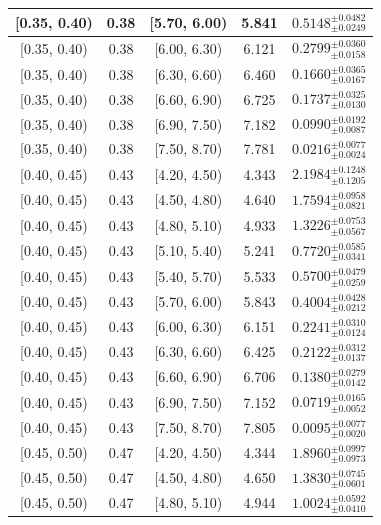 \begin{longtable}{|c|c|c|c|c|}
\hline
[0.35, 0.40) & 0.38 & [5.70, 6.00) & 5.841 & $0.5148^{ \pm 0.0482 }_{ \pm 0.0249 }$ \\ 
\hline
[0.35, 0.40) & 0.38 & [6.00, 6.30) & 6.121 & $0.2799^{ \pm 0.0360 }_{ \pm 0.0158 }$ \\ 
\hline
[0.35, 0.40) & 0.38 & [6.30, 6.60) & 6.460 & $0.1660^{ \pm 0.0365 }_{ \pm 0.0167 }$ \\ 
\hline
[0.35, 0.40) & 0.38 & [6.60, 6.90) & 6.725 & $0.1737^{ \pm 0.0325 }_{ \pm 0.0130 }$ \\ 
\hline
[0.35, 0.40) & 0.38 & [6.90, 7.50) & 7.182 & $0.0990^{ \pm 0.0192 }_{ \pm 0.0087 }$ \\ 
\hline
[0.35, 0.40) & 0.38 & [7.50, 8.70) & 7.781 & $0.0216^{ \pm 0.0077 }_{ \pm 0.0024 }$ \\ 
\hline
[0.40, 0.45) & 0.43 & [4.20, 4.50) & 4.343 & $2.1984^{ \pm 0.1248 }_{ \pm 0.1205 }$ \\ 
\hline
[0.40, 0.45) & 0.43 & [4.50, 4.80) & 4.640 & $1.7594^{ \pm 0.0958 }_{ \pm 0.0821 }$ \\ 
\hline
[0.40, 0.45) & 0.43 & [4.80, 5.10) & 4.933 & $1.3226^{ \pm 0.0753 }_{ \pm 0.0567 }$ \\ 
\hline
[0.40, 0.45) & 0.43 & [5.10, 5.40) & 5.241 & $0.7720^{ \pm 0.0585 }_{ \pm 0.0341 }$ \\ 
\hline
[0.40, 0.45) & 0.43 & [5.40, 5.70) & 5.533 & $0.5700^{ \pm 0.0479 }_{ \pm 0.0259 }$ \\ 
\hline
[0.40, 0.45) & 0.43 & [5.70, 6.00) & 5.843 & $0.4004^{ \pm 0.0428 }_{ \pm 0.0212 }$ \\ 
\hline
[0.40, 0.45) & 0.43 & [6.00, 6.30) & 6.151 & $0.2241^{ \pm 0.0310 }_{ \pm 0.0124 }$ \\ 
\hline
[0.40, 0.45) & 0.43 & [6.30, 6.60) & 6.425 & $0.2122^{ \pm 0.0312 }_{ \pm 0.0137 }$ \\ 
\hline
[0.40, 0.45) & 0.43 & [6.60, 6.90) & 6.706 & $0.1380^{ \pm 0.0279 }_{ \pm 0.0142 }$ \\ 
\hline
[0.40, 0.45) & 0.43 & [6.90, 7.50) & 7.152 & $0.0719^{ \pm 0.0165 }_{ \pm 0.0052 }$ \\ 
\hline
[0.40, 0.45) & 0.43 & [7.50, 8.70) & 7.805 & $0.0095^{ \pm 0.0077 }_{ \pm 0.0020 }$ \\ 
\hline
[0.45, 0.50) & 0.47 & [4.20, 4.50) & 4.344 & $1.8960^{ \pm 0.0997 }_{ \pm 0.0973 }$ \\ 
\hline
[0.45, 0.50) & 0.47 & [4.50, 4.80) & 4.650 & $1.3830^{ \pm 0.0745 }_{ \pm 0.0601 }$ \\ 
\hline
[0.45, 0.50) & 0.47 & [4.80, 5.10) & 4.944 & $1.0024^{ \pm 0.0592 }_{ \pm 0.0410 }$ \\ 

\end{longtable}

